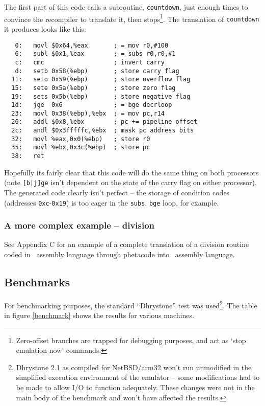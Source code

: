 The first part of this code calls a subroutine, {\tt countdown}, just enough times to convince the recompiler to translate it, then stops\footnote{Zero-offset branches are trapped for debugging purposes, and act as `stop emulation now' commands.}. The translation of {\tt countdown} it produces looks like this:

\begin{verbatim}
   0:	movl $0x64,%eax       ; = mov r0,#100
   6:	subl $0x1,%eax        ; = subs r0,r0,#1
   c:	cmc                   ; invert carry
   d:	setb 0x58(%ebp)       ; store carry flag
  11:	seto 0x59(%ebp)       ; store overflow flag
  15:	sete 0x5a(%ebp)       ; store zero flag
  19:	sets 0x5b(%ebp)       ; store negative flag
  1d:	jge  0x6              ; = bge decrloop
  23:	movl 0x38(%ebp),%ebx  ; = mov pc,r14
  26:	addl $0x8,%ebx        ; pc += pipeline offset
  2c:	andl $0x3fffffc,%ebx  ; mask pc address bits
  32:	movl %eax,0x0(%ebp)   ; store r0
  35:	movl %ebx,0x3c(%ebp)  ; store pc
  38:	ret    
\end{verbatim}

Hopefully its fairly clear that this code will do the same thing on both processors (note {\tt [b|j]ge} isn't dependent on the state of the carry flag on either processor). The generated code clearly isn't perfect -- the storage of condition codes (addresses {\tt 0xc}-{\tt 0x19}) is too eager in the {\tt subs}, {\tt bge} loop, for example.

\subsubsection{A more complex example -- division}

See Appendix C for an example of a complete translation of a division routine coded in \arm\ assembly language through phetacode into \ia\ assembly language.

\subsection{Benchmarks}

For benchmarking purposes, the standard ``Dhrystone'' test was used\footnote{Dhrystone 2.1 as compiled for NetBSD/arm32 won't run unmodified in the simplified execution environment of the emulator -- some modifications had to be made to allow I/O to function adequately. These changes were not in the main body of the benchmark and won't have affected the results.}. The table in figure \ref{benchmark} shows the results for various machines.

